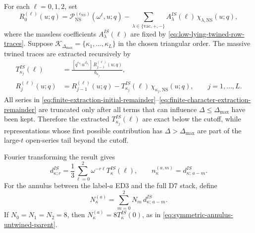 \documentclass[11pt]{article}
\newcommand{\vac}{\mathrm{vac}}
\newcommand{\NS}{\mathrm{NS}}
\begin{document}
For each \(\ell=0,1,2\), set
\begin{equation}
  R_0^{(\ell)}(u;q)
  =
  \mathcal P_{\NS}^{(\epsilon_{\NS})}(\omega^\ell,u;q)
  -
  \sum_{\lambda\in\{\vac,+,-\}}
  A_{\lambda}^{IS}(\ell)\,\chi_{\lambda,\NS}(u;q),
  \label{eq:finite-extraction-initial-remainder}
\end{equation}
where the massless coefficients \(A_{\lambda}^{IS}(\ell)\) are fixed by
\eqref{eq:low-lying-twined-row-traces}. Suppose
\(\mathcal K_{\Delta_{\max}}=\{\kappa_1,\ldots,\kappa_L\}\) in the chosen triangular order.
The massive twined traces are extracted recursively by
\begin{align}
  T_{\kappa_j}^{IS}(\ell)
  &=
  \frac{[q^{e_{\kappa_j}}u^{J_{\kappa_j}}]\,R_{j-1}^{(\ell)}(u;q)}
       {b_{\kappa_j}},
  \label{eq:finite-character-extraction-recursion}
  \\
  R_j^{(\ell)}(u;q)
  &=
  R_{j-1}^{(\ell)}(u;q)
  -
  T_{\kappa_j}^{IS}(\ell)\,\chi_{\kappa_j,\NS}(u;q),
  \qquad j=1,\ldots,L .
  \label{eq:finite-character-extraction-remainder}
\end{align}
All series in
\eqref{eq:finite-extraction-initial-remainder}--\eqref{eq:finite-character-extraction-remainder}
are truncated only after all terms that can influence \(\Delta\le\Delta_{\max}\) have been
kept. Therefore the extracted \(T_{\kappa_j}^{IS}(\ell)\) are exact below the cutoff, while
representations whose first possible contribution has \(\Delta>\Delta_{\max}\) are part of the
large-\(t\) open-series tail beyond the cutoff.

Fourier transforming the result gives
\begin{equation}
  d_{\kappa;r}^{IS}
  =
  \frac13\sum_{\ell=0}^{2}\omega^{-r\ell}T_{\kappa}^{IS}(\ell),
  \qquad
  n_{\kappa}^{(a,m)}=d_{\kappa;\,a-m}^{IS}.
  \label{eq:finite-extracted-fractional-coefficients}
\end{equation}
For the annulus between the label-\(a\) ED3 and the full D7 stack, define
\begin{equation}
  N_{\kappa}^{(a)}
  =
  \sum_{m=0}^{2}N_m\,d_{\kappa;\,a-m}^{IS}.
  \label{eq:finite-extracted-total-D7-coefficient}
\end{equation}
If \(N_0=N_1=N_2=8\), then \(N_{\kappa}^{(a)}=8T_{\kappa}^{IS}(0)\), as in
\eqref{eq:symmetric-annulus-untwined-parent}.
\end{document}
